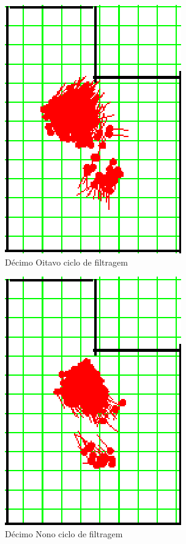 \begin{figure}[H]
  \centering
  \includegraphics[scale=0.6]{figuras/cen1_ex3/19.eps}
  \caption[Décimo Oitavo Ciclo de Filtragem]{Décimo Oitavo ciclo de filtragem}
  \label{img:cen1_ex3_19}
\end{figure}

\begin{figure}[H]
  \centering
  \includegraphics[scale=0.6]{figuras/cen1_ex3/20.eps}
  \caption[Décimo Nono Ciclo de Filtragem]{Décimo Nono ciclo de filtragem}
  \label{img:cen1_ex3_20}
\end{figure}


